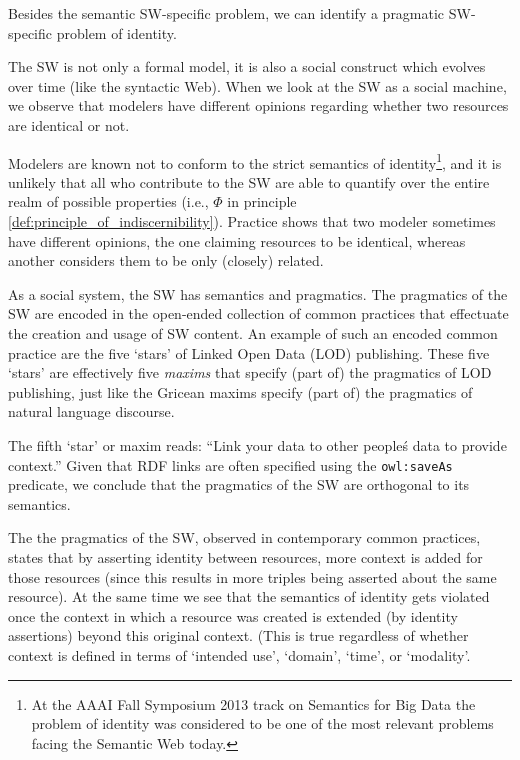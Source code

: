 Besides the semantic SW-specific problem,
we can identify a pragmatic SW-specific problem of identity.

The SW is not only a formal model,
it is also a social construct which evolves over time
(like the syntactic Web).
When we look at the SW as a social machine\cite{TODO},
we observe that modelers have different opinions regarding whether
two resources are identical or not.

Modelers are known not to conform to the strict semantics of identity\footnote{
  At the AAAI Fall Symposium 2013 track on Semantics for Big Data
  the problem of identity was considered to be one of the most
  relevant problems facing the Semantic Web today.
},
and it is unlikely that all who contribute to the SW are able to
quantify over the entire realm of possible properties
(i.e., $\Phi$ in principle \ref{def:principle_of_indiscernibility}).
Practice shows that two modeler sometimes have different opinions,
the one claiming resources to be identical,
whereas another considers them to be only (closely) related.

As a social system, the SW has semantics and pragmatics.
The pragmatics of the SW are encoded in the open-ended collection of
common practices that effectuate the creation and usage of SW content.
An example of such an encoded common practice are the five `stars'
of Linked Open Data (LOD) publishing.\cite{TODO}
These five `stars' are effectively five \emph{maxims} that specify
(part of) the pragmatics of LOD publishing,
just like the Gricean maxims specify
(part of) the pragmatics of natural language discourse.\cite{TODO}

The fifth `star' or maxim reads:
``Link your data to other people\'s data to provide context.''
Given that RDF links are often specified using
the \verb|owl:saveAs| predicate\cite{void},
we conclude that the pragmatics of the SW are orthogonal to its semantics.

The the pragmatics of the SW, observed in contemporary common practices,
states that by asserting identity between resources,
more context is added for those resources
(since this results in more triples being asserted about the same resource).
At the same time we see that the semantics of identity
gets violated once the context in which a resource was created
is extended (by identity assertions) beyond this original context.
(This is true regardless of whether context is defined in terms of
`intended use', `domain', `time', or `modality'.

